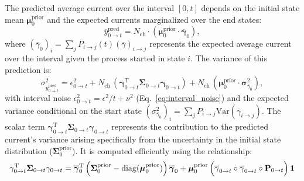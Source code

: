 \documentclass[pdflatex,sn-nature]{sn-jnl}%
\begin{document}
The predicted average current over the interval \([0, t]\) depends on the initial state mean \(\boldsymbol{\mu}^{\text{prior}}_0\) and the expected currents marginalized over the end states:
\begin{equation}
	\overline{y}^{\text{pred}}_{0 \rightarrow t} = N_{\text{ch}} \cdot (\boldsymbol{\mu}^{\text{prior}}_{0} \cdot \overline{\boldsymbol{\gamma}}_{0}),
	\label{eq:macro_interval_predicted_y}
\end{equation}
where \( (\overline{\gamma}_{0})_i = \sum_j P_{i\rightarrow j}(t) (\overline{\gamma})_{i \rightarrow j} \) represents the expected average current over the interval given the process started in state \(i\). The variance of this prediction is:
\begin{equation}
	\sigma^2_{\overline{y}^{\text{pred}}_{0 \rightarrow t}} = \epsilon^2_{0 \rightarrow t} + N_{\text{ch}} \,( \mathbf{\gamma}^{\mathrm{T}}_{0 \rightarrow t} \mathbf{\Sigma}_{0 \rightarrow t}\mathbf{\gamma}_{0 \rightarrow t}) + N_{\text{ch}} \, (\boldsymbol{\mu}^{\text{prior}}_{0} \cdot \boldsymbol{\sigma}^2_{\overline{\gamma}_{0}}),
	\label{eq:macro_interval_sigma_pred}
\end{equation}
with interval noise \( \epsilon^2_{0 \rightarrow t} = \epsilon^2/t + \nu^2 \) (Eq.~\ref{eq:interval_noise}) and the expected variance conditional on the start state \( (\sigma^2_{\overline{\gamma}_{0}})_i = \sum_j P_{i\rightarrow j} \mathrm{Var}(\overline{\gamma}_{i\rightarrow j}) \). The scalar term \( \mathbf{\gamma}^{\mathrm{T}}_{0 \rightarrow t} \mathbf{\Sigma}_{0 \rightarrow t}\mathbf{\gamma}_{0 \rightarrow t} \) represents the contribution to the predicted current's variance arising specifically from the uncertainty in the initial state distribution (\( \boldsymbol{\Sigma}^{\text{prior}}_{0} \)). It is  computed efficiently using the relationship:
\begin{multline}
	\mathbf{\gamma}^{\mathrm{T}}_{0 \rightarrow t} \mathbf{\Sigma}_{0 \rightarrow t}\mathbf{\gamma}_{0 \rightarrow t} = \overline{\boldsymbol{\gamma}}_{0}^{\mathrm{T}} \, \Bigl( \boldsymbol{\Sigma}^{\text{prior}}_{0} - \mathrm{diag}(\boldsymbol{\mu}^{\text{prior}}_0) \Bigr) \, \overline{\boldsymbol{\gamma}}_{0} 
	+ \boldsymbol{\mu}^{\text{prior}}_0 \, \Bigl( \overline{\mathbf{\gamma}}_{0 \rightarrow t}  \circ \overline{\mathbf{\gamma}}_{0 \rightarrow t} \circ \mathbf{P}_{0 \rightarrow t}\Bigr)\, \textbf{1}
	\label{eq:simplified_boundary_state} %
\end{multline}
\end{document}
